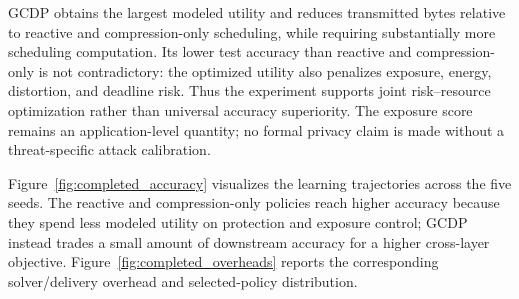 \documentclass[preprint,12pt]{elsarticle}
\begin{document}
\begin{table}[t]
\centering
\caption{Completed CIFAR-10 results (five seeds). ``Objective'' is the modeled per-round utility, not test accuracy.}
\label{tab:completed_results}
\end{table}

GCDP obtains the largest modeled utility and reduces transmitted bytes relative to reactive and compression-only scheduling, while requiring substantially more scheduling computation. Its lower test accuracy than reactive and compression-only is not contradictory: the optimized utility also penalizes exposure, energy, distortion, and deadline risk. Thus the experiment supports joint risk--resource optimization rather than universal accuracy superiority. The exposure score remains an application-level quantity; no formal privacy claim is made without a threat-specific attack calibration.

Figure~\ref{fig:completed_accuracy} visualizes the learning trajectories across the five seeds. The reactive and compression-only policies reach higher accuracy because they spend less modeled utility on protection and exposure control; GCDP instead trades a small amount of downstream accuracy for a higher cross-layer objective. Figure~\ref{fig:completed_overheads} reports the corresponding solver/delivery overhead and selected-policy distribution.
\end{document}
